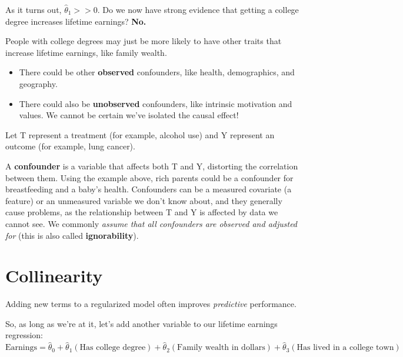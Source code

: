 \documentclass[
  letterpaper,
  DIV=11,
  numbers=noendperiod]{scrreprt}
\providecommand{\tightlist}{%
  \setlength{\itemsep}{0pt}\setlength{\parskip}{0pt}}\usepackage{longtable,booktabs,array}
\begin{document}
As it turns out, \(\hat{\theta}_1 >> 0\). Do we now have strong evidence
that getting a college degree increases lifetime earnings? \textbf{No.}

People with college degrees may just be more likely to have other traits
that increase lifetime earnings, like family wealth.

\begin{itemize}
\tightlist
\item
  There could be other \textbf{observed} confounders, like health,
  demographics, and geography.
\item
  There could also be \textbf{unobserved} confounders, like intrinsic
  motivation and values. We cannot be certain we've isolated the causal
  effect!
\end{itemize}

\begin{tcolorbox}[enhanced jigsaw, arc=.35mm, left=2mm, toprule=.15mm, leftrule=.75mm, bottomrule=.15mm, colframe=quarto-callout-note-color-frame, rightrule=.15mm, colbacktitle=quarto-callout-note-color!10!white, opacitybacktitle=0.6, coltitle=black, bottomtitle=1mm, colback=white, toptitle=1mm, title=\textcolor{quarto-callout-note-color}{\faInfo}\hspace{0.5em}{Confounding factor}, breakable, opacityback=0, titlerule=0mm]

Let T represent a treatment (for example, alcohol use) and Y represent
an outcome (for example, lung cancer).

A \textbf{confounder} is a variable that affects both T and Y,
distorting the correlation between them. Using the example above, rich
parents could be a confounder for breastfeeding and a baby's health.
Confounders can be a measured covariate (a feature) or an unmeasured
variable we don't know about, and they generally cause problems, as the
relationship between T and Y is affected by data we cannot see. We
commonly \emph{assume that all confounders are observed and adjusted
for} (this is also called \textbf{ignorability}).

\end{tcolorbox}

\section{Collinearity}\label{collinearity}

Adding new terms to a regularized model often improves \emph{predictive}
performance.

So, as long as we're at it, let's add another variable to our lifetime
earnings regression: \[
\widehat{\text{Earnings}} = \hat{\theta}_0 + \hat{\theta}_1 (\text{Has college degree}) + \hat{\theta}_2 (\text{Family wealth in dollars}) +  \hat{\theta}_3 (\text{Has lived in a college town})
\]
\end{document}
